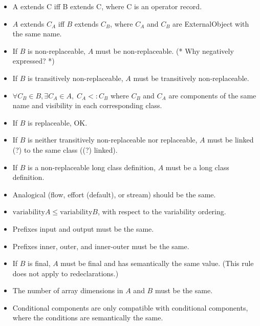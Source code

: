 \documentclass[10pt,b5paper]{article}
\begin{document}
\begin{itemize}

\item A extends C iff B extends C, where C is an operator record.

\item $A$ extends $C_A$ iff $B$ extends $C_B$, where $C_A$ and $C_B$
are ExternalObject with the same name.

\item If $B$ is non-replaceable, $A$ must be non-replaceable.  (* Why
negatively expressed? *)

\item If $B$ is transitively non-replaceable, $A$ must be transitively
non-replaceable.

\item $\forall C_B \in B, \exists C_A \in A,\; C_A <: C_B$ where $C_B$
and $C_A$ are components of the same name and visibility in each
corresponding class.

\item If $B$ is replaceable, OK.

\item If $B$ is neither transitively non-replaceable nor replaceable,
$A$ must be linked (?) to the same class ((?) linked).

\item If $B$ is a non-replaceable long class definition, $A$ must be a
long class definition.

\item Analogical (flow, effort (default), or stream) should be the
same.

\item $\mathrm{variability} A \leq \mathrm{variability} B$, with
respect to the variability ordering.

\item Prefixes input and output must be the same.

\item Prefixes inner, outer, and inner-outer must be the same.

\item If $B$ is final, $A$ must be final and has semantically the same
value.  (This rule does not apply to redeclarations.)

\item The number of array dimensions in $A$ and $B$ must be the same.

\item Conditional components are only compatible with conditional
components, where the conditions are semantically the same.


\end{itemize}
\end{document}
